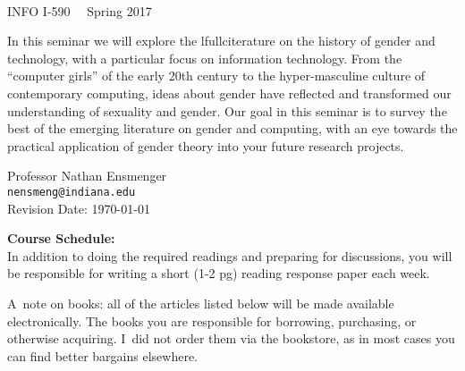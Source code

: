 \documentclass[11pt]{article}
\begin{document}
\thispagestyle{empty}
	
\begin{center}	
	
  \fontsize{28pt}{32pt} \selectfont {Technology \& Gender} \\
  \Large{INFO I-590 \textbullet \ \ Spring 2017}\\

\vspace{0.2in}

\setlength{\fboxsep}{0mm} %
\setlength{\fboxrule}{2pt}

\end{center}
 
\vspace{0.2in}

In this seminar we will explore the lfullciterature on the history of gender and technology, with a particular focus on information technology.  From the ``computer girls'' of the early 20th century to the hyper-masculine culture of contemporary computing, ideas about gender have reflected and transformed our understanding of sexuality and gender.  Our goal in this seminar is to survey the best of the emerging literature on gender and computing, with an eye towards the practical application of gender theory into your future research projects.


\vspace{0.1in}

\begin{center} 
 Professor Nathan Ensmenger\\ \texttt{nensmeng@indiana.edu}\\
\vspace{0.1in}
Revision Date: \today
\end{center}

\vspace{0.3in}

\newpage


\newpage
\large{\textbf{Course Schedule:}}\\


\noindent In addition to doing the required readings and preparing for discussions, you will be responsible for writing a short (1-2 pg) reading response paper each week.

\noindent A~note on books: all of the articles listed below will be made available electronically.  The books you are responsible for borrowing, purchasing, or otherwise acquiring.  I~did not order them via the bookstore, as in most cases you can find better bargains elsewhere.
\end{document}
